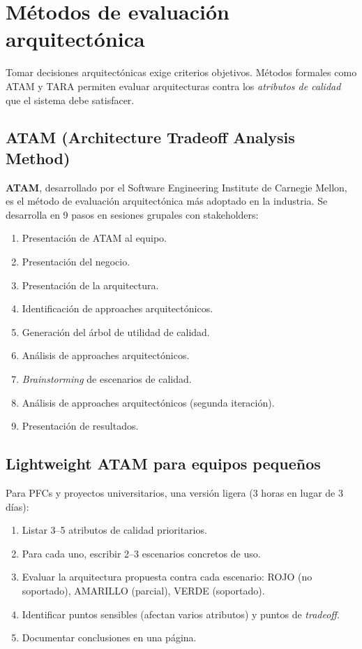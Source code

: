 \documentclass[11pt,a4paper,openany]{book}
\begin{document}
\section{Métodos de evaluación arquitectónica}

Tomar decisiones arquitectónicas exige criterios objetivos.
Métodos formales como ATAM y TARA permiten evaluar arquitecturas
contra los \emph{atributos de calidad} que el sistema debe satisfacer.


\subsection{ATAM (Architecture Tradeoff Analysis Method)}

\textbf{ATAM}, desarrollado por el Software Engineering Institute de
Carnegie Mellon, es el método de evaluación arquitectónica más
adoptado en la industria. Se desarrolla en 9 pasos en sesiones
grupales con stakeholders:

\begin{enumerate}
\item Presentación de ATAM al equipo.
\item Presentación del negocio.
\item Presentación de la arquitectura.
\item Identificación de approaches arquitectónicos.
\item Generación del árbol de utilidad de calidad.
\item Análisis de approaches arquitectónicos.
\item \emph{Brainstorming} de escenarios de calidad.
\item Análisis de approaches arquitectónicos (segunda iteración).
\item Presentación de resultados.
\end{enumerate}

\subsection{Lightweight ATAM para equipos pequeños}

Para PFCs y proyectos universitarios, una versión ligera (3 horas en
lugar de 3 días):

\begin{enumerate}
\item Listar 3--5 atributos de calidad prioritarios.
\item Para cada uno, escribir 2--3 escenarios concretos de uso.
\item Evaluar la arquitectura propuesta contra cada escenario:
ROJO (no soportado), AMARILLO (parcial), VERDE (soportado).
\item Identificar puntos sensibles (afectan varios atributos) y
puntos de \emph{tradeoff}.
\item Documentar conclusiones en una página.
\end{enumerate}
\end{document}
